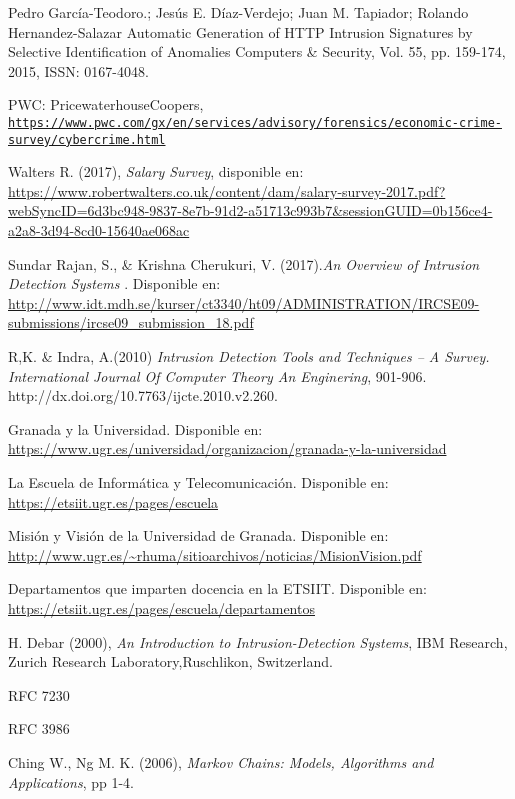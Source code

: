 \begin{thebibliography}{99}

Pedro García-Teodoro.; Jesús E. Díaz-Verdejo; Juan M. Tapiador; Rolando Hernandez-Salazar
Automatic Generation of HTTP Intrusion Signatures by Selective Identification of Anomalies
Computers \& Security, Vol. 55, pp. 159-174, 2015, ISSN: 0167-4048.

PWC: PricewaterhouseCoopers,
\\\texttt{\url{https://www.pwc.com/gx/en/services/advisory/forensics/economic-crime-survey/cybercrime.html}}

Walters R. (2017), \textit{Salary Survey}, disponible en: \url{https://www.robertwalters.co.uk/content/dam/salary-survey-2017.pdf?webSyncID=6d3bc948-9837-8e7b-91d2-a51713c993b7&sessionGUID=0b156ce4-a2a8-3d94-8cd0-15640ae068ac}

 Sundar Rajan, S., \& Krishna Cherukuri, V. (2017).\textit{An Overview of Intrusion Detection Systems }. Disponible en: \url{http://www.idt.mdh.se/kurser/ct3340/ht09/ADMINISTRATION/IRCSE09-submissions/ircse09_submission_18.pdf}

 R,K. \& Indra, A.(2010) \textit{Intrusion Detection Tools and Techniques --
A Survey. International Journal Of Computer Theory An Enginering}, 901-906. http://dx.doi.org/10.7763/ijcte.2010.v2.260.

 Granada y la Universidad. Disponible en: \url{https://www.ugr.es/universidad/organizacion/granada-y-la-universidad}

 La Escuela de Informática y Telecomunicación. Disponible en: \url{https://etsiit.ugr.es/pages/escuela}

 Misión y Visión de la Universidad de Granada. Disponible en: \url{http://www.ugr.es/~rhuma/sitioarchivos/noticias/MisionVision.pdf}

 Departamentos que imparten docencia en la ETSIIT. Disponible en: \url{https://etsiit.ugr.es/pages/escuela/departamentos}

H.   Debar (2000), \textit{An Introduction to Intrusion-Detection Systems},  IBM   Research,   Zurich   Research   Laboratory,Ruschlikon, Switzerland.

RFC 7230

RFC 3986

Ching W., Ng M. K. (2006), \textit{Markov Chains: Models, Algorithms and Applications}, pp 1-4.


\end{thebibliography}
